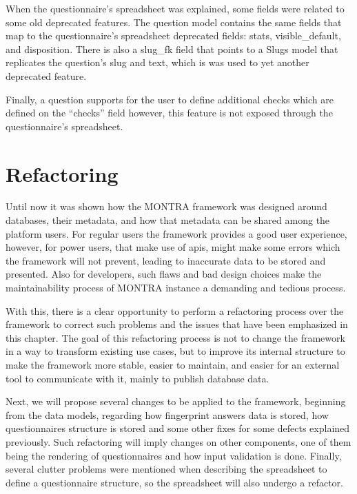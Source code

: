 When the questionnaire's spreadsheet was explained, some fields were related to some old deprecated features.
The question model contains the same fields that map to the questionnaire's spreadsheet deprecated fields: stats, visible\_default, and disposition.
There is also a slug\_fk field that points to a Slugs model that replicates the question's slug and text, which is was used to yet another deprecated feature.

Finally, a question supports for the user to define additional checks which are defined on the ``checks'' field however, this feature is not exposed through the questionnaire's spreadsheet.

\section{Refactoring}


Until now it was shown how the MONTRA framework was designed around databases, their metadata, and how that metadata can be shared among the platform users.
For regular users the framework provides a good user experience, however, for power users, that make use of \gls{api}s, might make some errors which the framework will not prevent, leading to inaccurate data to be stored and presented.
Also for developers, such flaws and bad design choices make the maintainability process of MONTRA instance a demanding and tedious process.

With this, there is a clear opportunity to perform a refactoring process over the framework to correct such problems and the issues that have been emphasized in this chapter.
The goal of this refactoring process is not to change the framework in a way to transform existing use cases, but to improve its internal structure to make the framework more stable, easier to maintain, and easier for an external tool to communicate with it, mainly to publish database data.

Next, we will propose several changes to be applied to the framework, beginning from the data models, regarding how fingerprint answers data is stored, how questionnaires structure is stored and some other fixes for some defects explained previously.
Such refactoring will imply changes on other components, one of them being the rendering of questionnaires and how input validation is done.
Finally, several clutter problems were mentioned when describing the spreadsheet to define a questionnaire structure, so the spreadsheet will also undergo a refactor.


